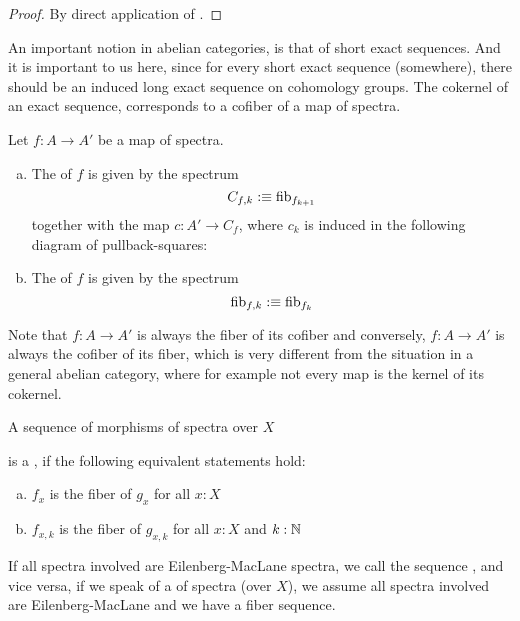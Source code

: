 \begin{proof}
  By direct application of .
\end{proof}

An important notion in abelian categories, is that of short exact sequences.
And it is important to us here, since for every short exact sequence (somewhere), there should be an induced long exact sequence on cohomology groups.
The cokernel of an exact sequence, corresponds to a cofiber of a map of spectra.

\begin{definition}
  Let $f:A\to A'$ be a map of spectra.
  \begin{enumerate}[(a)]
  \item The  of $f$ is given by the spectrum
    \[ C_{f,k}:\equiv \mathrm{fib}_{f_{k+1}}\]
    together with the map $c:A'\to C_f$, where $c_k$ is induced in the following diagram of pullback-squares:
    \begin{center}
    \end{center}
  \item The  of $f$ is given by the spectrum
    \[ \mathrm{fib}_{f,k}:\equiv \mathrm{fib}_{f_k}\]
  \end{enumerate}
\end{definition}

Note that $f:A\to A'$ is always the fiber of its cofiber and conversely, $f:A\to A'$ is always the cofiber of its fiber, which is very different from the situation in a general abelian category,
where for example not every map is the kernel of its cokernel.

\begin{definition}
  A sequence of morphisms of spectra over $X$
  \begin{center}
  \end{center}
  is a , if the following equivalent statements hold:
  \begin{enumerate}[(a)]
  \item $f_x$ is the fiber of $g_x$ for all $x:X$
  \item $f_{x,k}$ is the fiber of $g_{x,k}$ for all $x:X$ and $k:\mathbb{N}$
  \end{enumerate}
  If all spectra involved are Eilenberg-MacLane spectra, we call the sequence , and vice versa,
  if we speak of a  of spectra (over $X$), we assume all spectra involved are Eilenberg-MacLane and we have a fiber sequence.
\end{definition}

